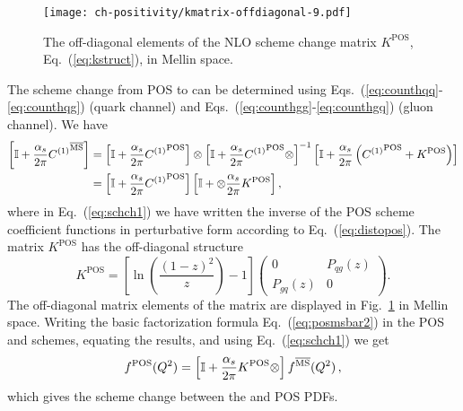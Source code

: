 \begin{figure}[t]
  \begin{center}
    \texttt{[image: ch-positivity/kmatrix-offdiagonal-9.pdf]}
    \caption{\small The off-diagonal  elements of the NLO scheme
      change matrix $K^{\textrm{POS}}$, Eq.~(\ref{eq:kstruct}), in Mellin space.
    \label{fig:kmat} }
  \end{center}
\end{figure}
The scheme change from
POS to \msbar{} can be determined using Eqs.~(\ref{eq:counthqq}-\ref{eq:counthqg}) (quark channel)
and Eqs.~(\ref{eq:counthgg}-\ref{eq:counthgq}) (gluon channel).
We have
\begin{align}
  \label{eq:schch0}
\left[\mathbb{I}
+\frac{\alpha_s}{2\pi} {C^{(1)}}^{{\overline{\textrm{{MS}}}}}\right]&=\left[\mathbb{I}
  +\frac{\alpha_s}{2\pi} {C^{(1)}}^{\textrm{POS}}\right]\otimes\left[\mathbb{I}
  +\frac{\alpha_s}{2\pi} {C^{(1)}}^{\textrm{POS}}\otimes\right]^{-1}\left[\mathbb{I}
  +\frac{\alpha_s}{2\pi}  \left({C^{(1)}}^{\textrm{POS}} +K^{\textrm{POS}}
\right)\right]\\
&=\left[\mathbb{I}
  +\frac{\alpha_s}{2\pi} {C^{(1)}}^{\textrm{POS}}
  \right]\left[\mathbb{I}
  + \otimes \frac{\alpha_s}{2\pi}  K^{\textrm{POS}}\right]
  , \label{eq:schch1}
\end{align}
where in Eq.~(\ref{eq:schch1}) we have written the inverse of the
POS scheme coefficient functions in perturbative form according to
Eq.~(\ref{eq:distopos}). The matrix  $K^{\textrm{POS}}$ has the
off-diagonal structure
\begin{equation}\label{eq:kstruct}
  K^{\textrm{POS}}=\left[\ln\left(\frac{(1-z)^2}{z}\right) - 1\right]
  \left(\begin{array}{cc} 0 & P_{qg}(z) \\
  P_{gq}(z) & 0\end{array}\right).
\end{equation}
The off-diagonal matrix elements of the matrix are displayed in
Fig.~\ref{fig:kmat} in Mellin space. 
Writing the basic factorization formula Eq.~(\ref{eq:posmsbar2}) in
the POS and \msbar{} schemes, equating the results, and using
Eq.~(\ref{eq:schch1}) we get
\begin{align}
  \label{eq:schch}
 f^{\textrm{POS}}(Q^2)=\left[\mathbb{I}
  +\frac{\alpha_s}{2\pi}  K^{\textrm{POS}}\otimes\right] f^{{\overline{\textrm{{MS}}}}}(Q^2)\,,
\end{align}
which gives the scheme change between the \msbar{} and POS PDFs. 

